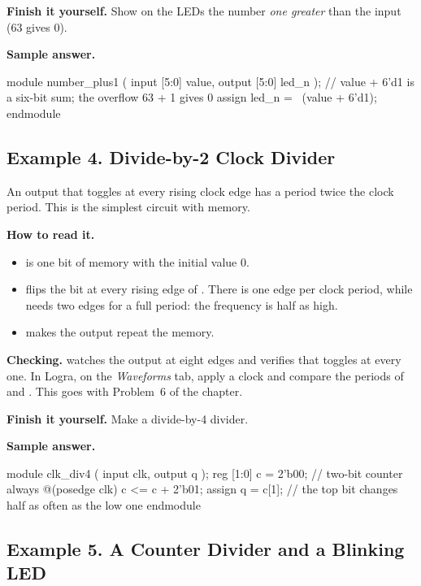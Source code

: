 \textbf{Finish it yourself.} Show on the LEDs the number \emph{one greater}
than the input (63 gives 0).

\textbf{Sample answer.}
\begin{vcode}
module number_plus1 (
    input  [5:0] value,
    output [5:0] led_n
);
    // value + 6'd1 is a six-bit sum; the overflow 63 + 1 gives 0
    assign led_n = ~(value + 6'd1);
endmodule
\end{vcode}

\subsection{Example 4. Divide-by-2 Clock Divider}

An output that toggles at every rising clock edge has a period twice the clock
period. This is the simplest circuit with memory.


\textbf{How to read it.}
\begin{itemize}
  \item {} is one bit of memory with the initial value 0.
  \item {} flips the bit at every rising edge of . There is one edge per clock period, while  needs two edges for a full period: the frequency is half as high.
  \item {} makes the output repeat the memory.
\end{itemize}
\textbf{Checking.}  watches the output at eight edges and
verifies that  toggles at every one. In Logra, on the \emph{Waveforms}
tab, apply a clock and compare the periods of  and . This
goes with Problem~6 of the chapter.

\textbf{Finish it yourself.} Make a divide-by-4 divider.

\textbf{Sample answer.}
\begin{vcode}
module clk_div4 (
    input  clk,
    output q
);
    reg [1:0] c = 2'b00;                 // two-bit counter
    always @(posedge clk) c <= c + 2'b01;
    assign q = c[1];                     // the top bit changes half as often as the low one
endmodule
\end{vcode}

\subsection{Example 5. A Counter Divider and a Blinking LED}

